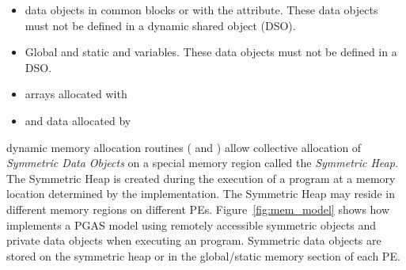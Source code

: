 \begin{itemize}
\item
  \begin{deprecate}
    \Fortran data objects in common blocks or with the  attribute.
    These data objects must not be defined in a dynamic shared object (DSO).
  \end{deprecate}
\item Global and static \Cstd and \Cpp variables. These data objects must
  not  be defined in a DSO.
\item
  \begin{deprecate}
    \Fortran arrays allocated with 
  \end{deprecate}
\item \Cstd and \Cpp data allocated by 
\end{itemize}       

\openshmem dynamic memory allocation routines ( and
) allow collective allocation of \emph{Symmetric Data
Objects} on a special memory region called the \emph{Symmetric Heap}. The
Symmetric Heap  is created during the execution of a program at 
a memory location determined by the implementation. The Symmetric Heap   
may reside in different memory regions on different \acp{PE}. Figure~\ref{fig:mem_model} shows how
\openshmem implements a \ac{PGAS} model using remotely accessible symmetric
objects and private data objects when executing an \openshmem program.
Symmetric data objects are stored on the symmetric heap or in the global/static
memory section of each \ac{PE}. 

